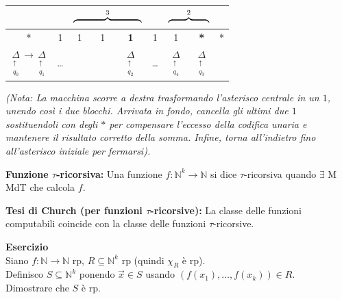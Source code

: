 \begin{center}
\begin{tabular}{c|c|c|c|c|c|c|c|c}
\multicolumn{1}{c}{} & \multicolumn{1}{c}{} & \multicolumn{3}{c}{$\overbrace{\hspace{2.5cm}}^{3}$} & \multicolumn{1}{c}{} & \multicolumn{2}{c}{$\overbrace{\hspace{1.5cm}}^{2}$} & \multicolumn{1}{c}{} \\
\hline
* & 1 & 1 & 1 & \textbf{1} & 1 & 1 & \textbf{*} & * \\
\hline
\multicolumn{1}{c}{$\underset{\substack{\uparrow \\ q_0}}{\Delta} \rightarrow \underset{\substack{\uparrow \\ q_1}}{\Delta}$} & \multicolumn{1}{c}{\dots} & \multicolumn{1}{c}{} & \multicolumn{1}{c}{} & \multicolumn{1}{c}{$\underset{\substack{\uparrow \\ q_2}}{\Delta}$} & \multicolumn{1}{c}{\dots} & \multicolumn{1}{c}{$\underset{\substack{\uparrow \\ q_4}}{\Delta}$} & \multicolumn{1}{c}{$\underset{\substack{\uparrow \\ q_3}}{\Delta}$} & \multicolumn{1}{c}{}
\end{tabular}
\end{center}
\textit{(Nota: La macchina scorre a destra trasformando l'asterisco centrale in un $1$, unendo così i due blocchi. Arrivata in fondo, cancella gli ultimi due $1$ sostituendoli con degli $*$ per compensare l'eccesso della codifica unaria e mantenere il risultato corretto della somma. Infine, torna all'indietro fino all'asterisco iniziale per fermarsi).}

\vspace{0.6cm}
\textbf{Funzione $\tau$-ricorsiva:} Una funzione $f: \mathbb{N}^k \to \mathbb{N}$ si dice $\tau$-ricorsiva quando $\exists$ M MdT che calcola $f$.

\vspace{0.4cm}
\textbf{Tesi di Church (per funzioni $\tau$-ricorsive):} La classe delle funzioni computabili coincide con la classe delle funzioni $\tau$-ricorsive.

\vspace{0.6cm}
\textbf{Esercizio} \\
Siano $f: \mathbb{N} \to \mathbb{N}$ rp, $R \subseteq \mathbb{N}^k$ rp (quindi $\chi_R$ è rp). \\
Definisco $S \subseteq \mathbb{N}^k$ ponendo $\vec{x} \in S$ usando $(f(x_1), \dots, f(x_k)) \in R$. \\
Dimostrare che $S$ è rp.

